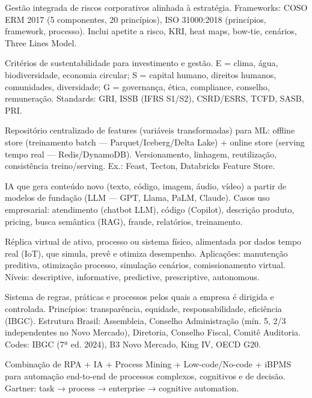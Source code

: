 \begin{ecglossario}
\item[\textbf{ERM (Enterprise Risk Management)}] Gestão integrada de riscos corporativos alinhada à estratégia. Frameworks: COSO ERM 2017 (5 componentes, 20 princípios), ISO 31000:2018 (princípios, framework, processo). Inclui apetite a risco, KRI, heat maps, bow-tie, cenários, Three Lines Model.

\item[\textbf{ESG (Environmental, Social, Governance)}] Critérios de sustentabilidade para investimento e gestão. E = clima, água, biodiversidade, economia circular; S = capital humano, direitos humanos, comunidades, diversidade; G = governança, ética, compliance, conselho, remuneração. Standards: GRI, ISSB (IFRS S1/S2), CSRD/ESRS, TCFD, SASB, PRI.

\item[\textbf{Feature Store}] Repositório centralizado de features (variáveis transformadas) para ML: offline store (treinamento batch — Parquet/Iceberg/Delta Lake) + online store (serving tempo real — Redis/DynamoDB). Versionamento, linhagem, reutilização, consistência treino/serving. Ex.: Feast, Tecton, Databricks Feature Store.

\item[\textbf{GenAI (Generative AI)}] IA que gera conteúdo novo (texto, código, imagem, áudio, vídeo) a partir de modelos de fundação (LLM — GPT, Llama, PaLM, Claude). Casos uso empresarial: atendimento (chatbot LLM), código (Copilot), descrição produto, pricing, busca semântica (RAG), fraude, relatórios, treinamento.

\item[\textbf{Gêmeo Digital (Digital Twin)}] Réplica virtual de ativo, processo ou sistema físico, alimentada por dados tempo real (IoT), que simula, prevê e otimiza desempenho. Aplicações: manutenção preditiva, otimização processo, simulação cenários, comissionamento virtual. Níveis: descriptive, informative, predictive, prescriptive, autonomous.

\item[\textbf{Governança Corporativa}] Sistema de regras, práticas e processos pelos quais a empresa é dirigida e controlada. Princípios: transparência, equidade, responsabilidade, eficiência (IBGC). Estrutura Brasil: Assembleia, Conselho Administração (mín. 5, 2/3 independentes no Novo Mercado), Diretoria, Conselho Fiscal, Comitê Auditoria. Codes: IBGC (7ª ed. 2024), B3 Novo Mercado, King IV, OECD G20.

\item[\textbf{Hiperautomação}] Combinação de RPA + IA + Process Mining + Low-code/No-code + iBPMS para automação end-to-end de processos complexos, cognitivos e de decisão. Gartner: task → process → enterprise → cognitive automation.


\end{ecglossario}

